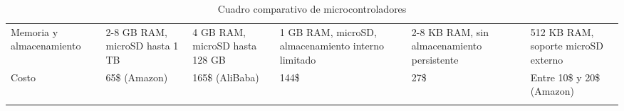 {\begin{longtable}[c]{p{2.2cm} p{2.4cm} p{2.4cm} p{2.4cm} p{2.4cm} p{2.4cm}}
    \addlinespace
    Memoria y almacenamiento                                               &
    2-8 GB RAM, microSD hasta 1 TB                                         &
    4 GB RAM, microSD hasta 128 GB                                         &
    1 GB RAM, microSD, almacenamiento interno limitado                     &
    2-8 KB RAM, sin almacenamiento persistente                             &
    512 KB RAM, soporte microSD externo                                      \\
    \addlinespace
    Costo                                                                  &
    65\$ (Amazon)                                                          &
    165\$ (AliBaba)                                                        &
    144\$                                                                  &
    27\$                                                                   &
    Entre 10\$ y 20\$ (Amazon)
    \\
    \hline
    \caption{Cuadro comparativo de microcontroladores}
    \label{tab:cuadro_comparativo_microcontroladores}
  \end{longtable}
}



